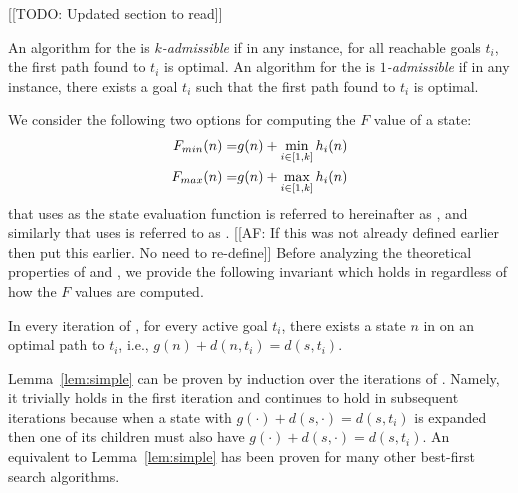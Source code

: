 \label{sec:aggregating}

[[TODO: Updated section to read]]

\begin{definition}
  An algorithm for the \kgs is \emph{$k$-admissible} if in any instance, for all reachable goals $t_i$, the first path found to $t_i$ is optimal.
  An algorithm for the \kgs is \emph{$1$-admissible} if in any instance, there exists a goal $t_i$ such that the first path found to $t_i$ is optimal.
\end{definition}

We consider the following two options for computing the $F$ value of a state:  
\begin{align}
  \text{$F_{min}(n)$} =& g(n) + \min_{i\in [1,k]}h_i(n) \\
  \text{$F_{max}(n)$} =& g(n) + \max_{i\in [1,k]}h_i(n)
\end{align}
\kastar that uses \minf as the state evaluation function is referred to hereinafter as \kastarmin, and similarly \kastar that uses \maxf is referred to as \kastarmax. [[AF: If this was not already defined earlier then put this earlier. No need to re-define]]
Before analyzing the theoretical properties of \kastarmin and \kastarmax, we provide the following invariant which holds in \kastar regardless of how the $F$ values are computed.

\begin{lemma}
  \label{lem:simple}
  In every iteration of \kastar, for every active goal $t_i$, there exists a state $n$ in \open on an optimal path to $t_i$, i.e., $g(n) + d(n, t_i) = d(s, t_i)$.
\end{lemma}

Lemma~\ref{lem:simple} can be proven by induction over the iterations of \kastar.
Namely, it trivially holds in the first iteration and continues to hold in subsequent iterations because when a state with $g(\cdot) + d(s,\cdot) = d(s, t_i)$ is expanded then one of its children must also have $g(\cdot) + d(s,\cdot) = d(s, t_i)$.
An equivalent to Lemma~\ref{lem:simple} has been proven for many other best-first search algorithms.

